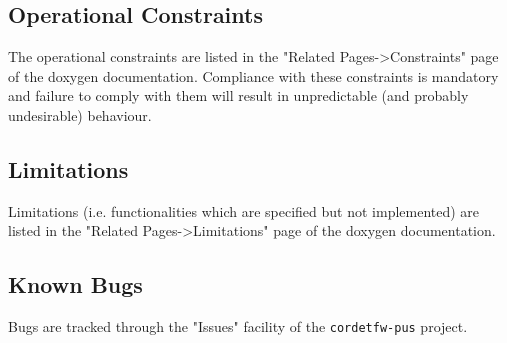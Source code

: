 \documentclass{pnp_article}
\begin{document}
\subsection{Operational Constraints}
The operational constraints are listed in the "Related Pages->Constraints" page of the doxygen documentation. Compliance with these constraints is mandatory and failure to comply with them will result in unpredictable (and probably undesirable) behaviour.


\subsection{Limitations}
Limitations (i.e. functionalities which are specified but not implemented) are listed in the "Related Pages->Limitations" page of the doxygen documentation.

\subsection{Known Bugs}
Bugs are tracked through the "Issues" facility of the \texttt{cordetfw-pus} project.


\begin{landscape}


\end{landscape}
\end{document}
